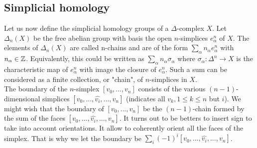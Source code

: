 \documentclass[12pt, a4paper]{article}
\begin{document}
\subsection{Simplicial homology}

Let us now define the simplicial homology groups of a $\Delta$-complex $X$. Let $\Delta_n(X)$ be the free abelian group with basis the open $n$-simplices $e^n_\alpha$ of $X$. The elements of $\Delta_n(X)$ are called n-chains and are of the form $\sum_\alpha n_\alpha e^n_\alpha$ with $n_\alpha \in \mathbb{Z}$. Equivalently, this could be written as $\sum_\alpha n_\alpha \sigma_\alpha$ where $\sigma_\alpha : \Delta^n \to X$ is the characteristic map of $e^n_\alpha$ with image the closure of $e^n_\alpha$. Such a sum can be considered as a finite collection, or "chain", of $n$-simplices in $X$.\\

The boundary of the $n$-simplex $[v_0, ..., v_n]$ consists of the various $(n-1)$-dimensional simplices $[v_0, ... , \hat{v_i} , ... , v_n]$ (indicates all $v_{k}, 1 \le k \le n$ but $i$). We might wish that the boundary of  $[v_0, ..., v_n]$ be the $(n-1)$-chain formed by the sum of the faces $[v_0, ... ,\hat{v_i} , ... , v_n]$. It turns out to be betters to insert sign to take into account orientations. It allow to coherently orient all the faces of the simplex. That is why we let the boundary be $\sum_i (-1)^i [v_0, ... , \hat{v_i} , ... , v_n]$.\\
\end{document}
